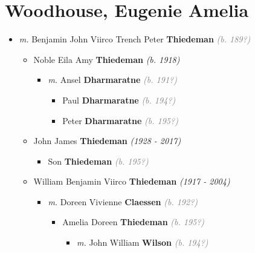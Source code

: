 \documentclass[10pt, openany]{book}
\begin{document}
\chapter{Woodhouse, Eugenie Amelia}
\label{00001853}
\textcolor{slmaroon}{\textit{}}
\begin{itemize}
\item{\textit{m.} Benjamin John Viirco Trench Peter \textbf{Thiedeman} \textcolor{gray}{\textit{(b. 189?)}}   \label{couple:00001853:00001854} \begin{itemize}
\item{Noble Eila Amy \textbf{Thiedeman} \textcolor{slorange}{\textit{(b. 1918)}}
\begin{itemize}
\item{\textit{m.} Ansel \textbf{Dharmaratne} \textcolor{gray}{\textit{(b. 191?)}}   \label{couple:00001872:00001873} \begin{itemize}
\item{Paul \textbf{Dharmaratne} \textcolor{gray}{\textit{(b. 194?)}}
 }
\item{Peter \textbf{Dharmaratne} \textcolor{gray}{\textit{(b. 195?)}}
 }
\end{itemize}}
\end{itemize}
   }
\item{John James \textbf{Thiedeman} \textcolor{slorange}{\textit{(1928 - 2017)}}
\begin{itemize}
\item{Son \textbf{Thiedeman} \textcolor{gray}{\textit{(b. 195?)}}
 }
\end{itemize}
  }
\item{William Benjamin Viirco  \textbf{Thiedeman} \textcolor{slorange}{\textit{(1917 - 2004)}}
\begin{itemize}
\item{\textit{m.} Doreen Vivienne \textbf{Claessen} \textcolor{gray}{\textit{(b. 192?)}}   \label{couple:00001855:00001861} \begin{itemize}
\item{Amelia Doreen \textbf{Thiedeman} \textcolor{gray}{\textit{(b. 195?)}}
\begin{itemize}
\item{\textit{m.} John William \textbf{Wilson} \textcolor{gray}{\textit{(b. 194?)}}   \label{couple:00001868:00001869} \begin{itemize}

\end{itemize}}
\end{itemize}}
\end{itemize}}
\end{itemize}}
\end{itemize}}
\end{itemize}
\end{document}
